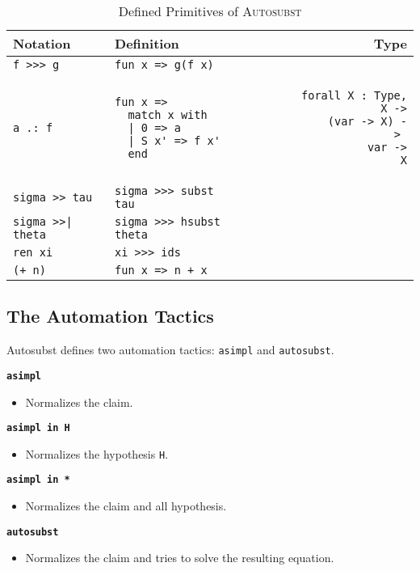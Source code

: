 \documentclass{scrartcl}
\newcommand{\faq}[2]{\vspace{\topsep}\noindent\textbf{#1}\\\vspace{-\topsep}\begin{itemize}[nolistsep]\item[]{#2}\end{itemize}}
\newcommand{\Autosubst}{\textsc{Autosubst}\xspace}
\newcommand{\stackr}[2]{\vtop{\setbox0\hbox{\strut #1}\copy0\hbox to\wd0{\hss\strut #2}}}
\newcommand{\lst}{\lstinline}
\begin{document}
\begin{table}
  \centering
  \lstset{boxpos=t, aboveskip=0em, belowskip=0em}
  \begin{tabular}{l l r}
  Notation         & Definition                                       & Type                                   \\\hline\noalign{\vspace{0.5em}}
  
  \lst$f >>> g$    & \lst$fun x => g(f x)$                            & \stackr{\lst$forall A B C : Type, (A -> B) ->$}{\stackr{\lst$(B -> C) ->$}{\lst$A -> C$}} \\\noalign{\vspace{-1em}}
  \begin{lstlisting}
a .: f
  \end{lstlisting}
&\begin{lstlisting}
fun x => 
  match x with 
  | 0 => a 
  | S x' => f x' 
  end    
\end{lstlisting}
&
\begin{lstlisting}
forall X : Type,         X ->
           (var -> X) -> 
                var -> X
\end{lstlisting}  \\
  \lst$sigma >> tau$& \lst$sigma >>> subst tau$    & 
\stackr{\lst$(var -> term) ->$}{\stackr{\lst$(var -> term) ->$}{\lst$var -> term$}}     \\
\lst$sigma >>| theta$& \lst$sigma >>> hsubst theta$ & 
\stackr{\lst$(var -> term1) ->$}{\stackr{\lst$(var -> term2) ->$}{\lst$var -> term1$}} \\
\lst$ren xi$ & \lst$xi >>> ids$ & \stackr{\lst$(var -> var) ->$}{\lst$var -> term$} \\
\lst$(+ n)$ & \lst$fun x => n + x$ & \stackr{\lst$var ->$}{\lst$var -> var$}
\end{tabular}
  \caption{Defined Primitives of \Autosubst}
  \label{tab:defined-ops}
\end{table}

\subsection{The Automation Tactics}
\label{sec:lstautosubst-tactic}

Autosubst defines two automation tactics: \lst$asimpl$ and \lst$autosubst$.

\faq{\lst$asimpl$}{Normalizes the claim.}
\faq{\lst$asimpl in H$}{Normalizes the hypothesis \lst$H$.}
\faq{\lst$asimpl in *$}{Normalizes the claim and all hypothesis.}
\faq{\lst$autosubst$}{Normalizes the claim and tries to solve the resulting equation.}
\vspace{\topsep}
\end{document}
